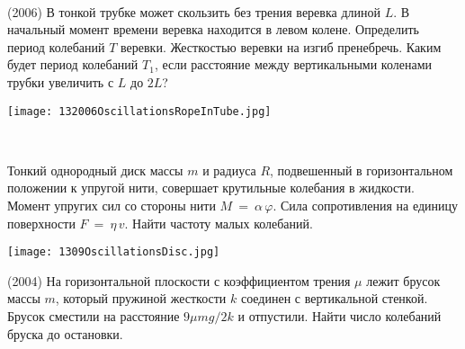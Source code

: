 \begin{ex}
\hspace{0pt} \\
\begin{minipage}{.65\textwidth} 
(2006) В тонкой трубке может скользить без трения веревка длиной $L$. В начальный момент времени веревка находится в левом колене. 
Определить период колебаний $T$ веревки. Жесткостью веревки на изгиб пренебречь. 
Каким будет период колебаний $T_1$, если расстояние между вертикальными коленами трубки увеличить с $L$ до $2L$?
\end{minipage}
\begin{minipage}{.35\textwidth}
\centering
\texttt{[image: 132006OscillationsRopeInTube.jpg]}
\end{minipage}
\begin{ans}
\end{ans}
\end{ex}


\begin{ex}
\hspace{0pt} \\
\begin{minipage}{.65\textwidth} 
Тонкий однородный диск массы $m$ и радиуса $R$, подвешенный в горизонтальном положении к упругой нити, совершает крутильные колебания в жидкости. 
Момент упругих сил со стороны нити $M~=~\alpha\,\varphi$.  Сила сопротивления на единицу поверхности $F~=~\eta\,v$. Найти частоту малых колебаний.
\end{minipage}
\begin{minipage}{.35\textwidth}
\centering
\texttt{[image: 1309OscillationsDisc.jpg]}
\end{minipage}
\begin{ans}
\end{ans}
\end{ex}

\begin{ex}
(2004) На горизонтальной плоскости с коэффициентом трения $\mu$ лежит брусок массы $m$, который пружиной жесткости $k$ соединен с вертикальной стенкой. Брусок сместили на расстояние $9\mu mg /2k$ и отпустили. Найти число колебаний бруска до остановки.
\begin{ans}
\end{ans}
\end{ex}

